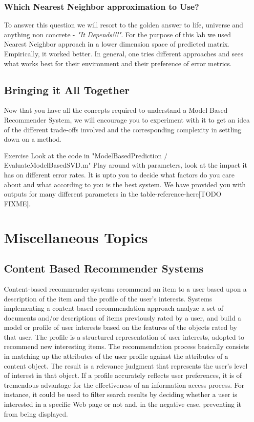   \subsubsection{Which Nearest Neighbor approximation to Use?}
  To answer this question we will resort to the golden answer to life, universe and anything non concrete - \textit{"It Depends!!!"}. For the purpose of this lab we used Nearest Neighbor approach in a lower dimension space of predicted matrix. Empirically, it worked better. In general, one tries different approaches and sees what works best for their environment and their preference of error metrics.
  \subsection{Bringing it All Together}
  Now that you have all the concepts required to understand a Model Based Recommender System, we will encourage you to experiment with it to get an idea of the different trade-offs involved and the corresponding complexity in settling down on a method.
\begin{myremark}{Exercise }
Look at the code in "ModelBasedPrediction / EvaluateModelBasedSVD.m" Play around with parameters, look at the impact it has on different error rates. It is upto you to decide what factors do you care about and what according to you is the best system. We have provided you with outputs for many different parameters in the table-reference-here[TODO FIXME].
\end{myremark}
  \section{Miscellaneous Topics}
  \subsection{Content Based Recommender Systems}

 Content-based recommender systems recommend an item to a user based upon a description of the item and the profile of the user’s interests. Systems implementing a content-based recommendation approach analyze a set of documents and/or descriptions of items previously rated by a user, and build a model or profile of user interests based on the features of the objects rated by that user. The profile is a structured representation of user interests, adopted to recommend new interesting items. The recommendation process basically consists in matching up the attributes of the user profile against the attributes of a content object. The result is a relevance judgment that represents the user’s level of interest in that object. If a profile accurately reflects user preferences, it is of tremendous advantage for the effectiveness of an information access process. For instance, it could be used to filter search results by deciding whether a user is interested in a specific Web page or not and, in the negative case, preventing it from being displayed.

